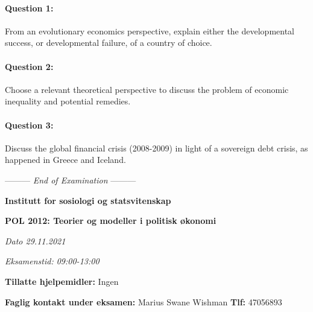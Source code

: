 \documentclass[a4paper,12pt,fleqn]{article}
\newcommand{\institusjon}{Institutt for sosiologi og statsvitenskap}
\newcommand{\tittelhd}{POL 2012: Teorier og modeller i politisk økonomi}
\newcommand{\examdate}{29.11.2021}
\newcommand{\examtime}{09:00-13:00}
\newcommand{\lastwords}{End of Examination}
\begin{document}
\paragraph{\textbf{Question 1:}}

From an evolutionary economics perspective, explain either the developmental
success, or developmental failure, of a country of choice.

\paragraph{\textbf{Question 2:}}

Choose a relevant theoretical perspective to discuss the problem of economic
inequality and potential remedies.

\paragraph{\textbf{Question 3:}}

Discuss the global financial crisis (2008-2009) in light of a sovereign debt
crisis, as happened in Greece and Iceland.

\begin{center}
\vspace{3cm}
--------- \textit{\lastwords} ---------
\end{center}

\clearpage

\begin{center}
\large\textbf{\institusjon}
\end{center}
\vspace{.5cm}

\begin{center}
\large\textbf{\tittelhd}
\end{center}

\begin{center}
\textit{Dato \examdate}
\end{center}

\begin{center}
\textit{Eksamenstid: \examtime}
\end{center}

\vspace{.5cm}

\begin{center}
	\textbf{Tillatte hjelpemidler:} Ingen
\end{center}

\begin{center}
	\textbf{Faglig kontakt under eksamen:} Marius Swane Wishman
	\textbf{Tlf:} 47056893
\end{center}
\end{document}
